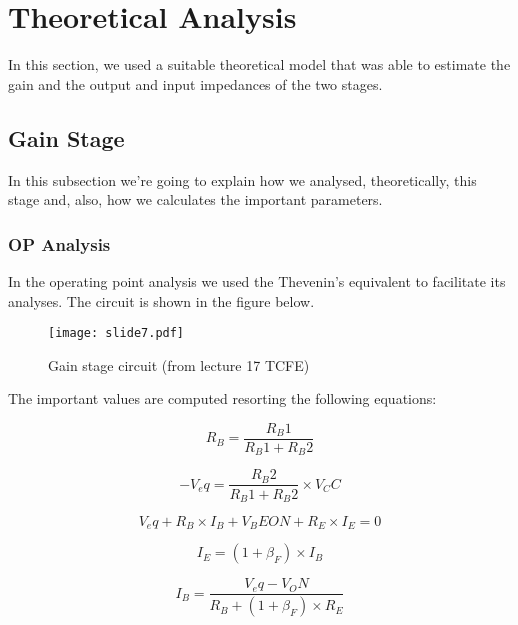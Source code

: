 \section{Theoretical Analysis}
\label{sec:analysis}

In this section, we used a suitable theoretical model that was able to estimate the gain and the output and input impedances of the two stages.

\subsection{Gain Stage}

In this subsection we're going to explain how we analysed, theoretically, this stage and, also, how we calculates the important parameters.

\subsubsection{OP Analysis}

In the operating point analysis we used the Thevenin's equivalent to facilitate its analyses. The circuit is shown in the figure below.

\begin{figure}[h] \centering
\texttt{[image: slide7.pdf]}
\caption{Gain stage circuit (from lecture 17 TCFE) }
\label{fig:rc2a}
\end{figure} 

The important values are computed resorting the following equations:

\begin{equation}
R_B =\frac{R_B1}{R_B1 + R_B2}
\end{equation}

\begin{equation}
- V_eq = \frac{R_B2}{R_B1 + R_B2} \times V_CC
\end{equation}

\begin{equation}
V_eq + R_B \times I_B + V_BEON + R_E \times I_E = 0    
\end{equation}

\begin{equation}
I_E = (1 + \beta_F ) \times I_B    
\end{equation}

\begin{equation}
I_B =\frac{V_eq - V_ON}{R_B + (1 + \beta_F ) \times R_E}    
\end{equation}

